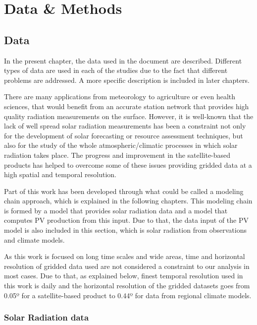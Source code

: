\part{Data \& Methods\label{cha:datamethods}}

   
\chapter{Data\label{cha:Data}}

  In the present chapter, the data used in the document are described. Different types of data are used in each of the studies due to the fact that different problems are addressed. A more specific description is included in later chapters.

  There are many applications from meteorology to agriculture or even health sciences, that would benefit from an accurate station network that provides high quality radiation measurements on the surface. However, it is well-known that the lack of  well spread solar radiation measurements has been a constraint not only for the development of solar forecasting or resource assessment techniques, but also for the study of the whole atmospheric/climatic processes in which solar radiation takes place. The progress and improvement in the satellite-based products has helped to overcome some of these issues providing gridded data at a high spatial and temporal resolution.

  Part of this work has been developed through what could be called a modeling chain approach, which is explained in the following chapters. This modeling chain is formed by a model that provides solar radiation data and a model that computes PV production from this input. Due to that, the data input of the PV model is also included in this section, which is solar radiation from observations and climate models.

As this work is focused on long time scales and wide areas, time and horizontal resolution of gridded data used are not considered a constraint to our analysis in most cases. Due to that, as explained below, finest temporal resolution used in this work is daily and the horizontal resolution of the gridded datasets goes from 0.05º for a satellite-based product to 0.44º for data from regional climate models.    
\section{Solar Radiation data}

